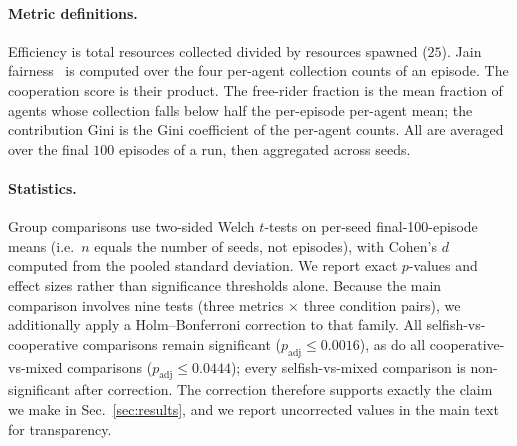 \documentclass[sigconf,nonacm,anonymous,review]{acmart}
\begin{document}
\paragraph{Metric definitions.} Efficiency is total resources collected divided by resources
spawned ($25$). Jain fairness~\cite{jain1984fairness} is computed over the four per-agent
collection counts of an episode. The cooperation score is their product. The free-rider
fraction is the mean fraction of agents whose collection falls below half the per-episode
per-agent mean; the contribution Gini is the Gini coefficient of the per-agent counts. All
are averaged over the final $100$ episodes of a run, then aggregated across seeds.

\paragraph{Statistics.} Group comparisons use two-sided Welch $t$-tests on per-seed
final-100-episode means (i.e.\ $n$ equals the number of seeds, not episodes), with Cohen's $d$
computed from the pooled standard deviation. We report exact $p$-values and effect sizes rather
than significance thresholds alone. Because the main comparison involves nine tests (three
metrics $\times$ three condition pairs), we additionally apply a Holm--Bonferroni correction to
that family. All selfish-vs-cooperative comparisons remain significant
($p_{\text{adj}}\le0.0016$), as do all cooperative-vs-mixed comparisons
($p_{\text{adj}}\le0.0444$); every selfish-vs-mixed comparison is non-significant after
correction. The correction therefore supports exactly the claim we make in
Sec.~\ref{sec:results}, and we report uncorrected values in the main text for transparency.
\end{document}
